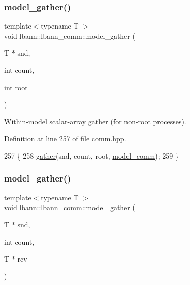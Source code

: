 \subsubsection{\texorpdfstring{model\+\_\+gather()}{model\_gather()}\hspace{0.1cm}{\footnotesize\ttfamily [3/4]}}
{\footnotesize\ttfamily template$<$typename T $>$ \\
void lbann\+::lbann\+\_\+comm\+::model\+\_\+gather (\begin{DoxyParamCaption}\item[{T $\ast$}]{snd,  }\item[{int}]{count,  }\item[{int}]{root }\end{DoxyParamCaption})\hspace{0.3cm}{\ttfamily [inline]}}

Within-\/model scalar-\/array gather (for non-\/root processes). 

Definition at line 257 of file comm.\+hpp.


\begin{DoxyCode}
257                                                  \{
258     \hyperlink{classlbann_1_1lbann__comm_aa784298e6ed0f9f01a20b179d5110df9}{gather}(snd, count, root, \hyperlink{classlbann_1_1lbann__comm_a58a75b76bd61ec8a26c1cbbec3dc2f45}{model\_comm});
259   \}
\end{DoxyCode}
\mbox{\label{classlbann_1_1lbann__comm_adc1c96023f4546d57f0a85e905d070b4}} 
\subsubsection{\texorpdfstring{model\+\_\+gather()}{model\_gather()}\hspace{0.1cm}{\footnotesize\ttfamily [4/4]}}
{\footnotesize\ttfamily template$<$typename T $>$ \\
void lbann\+::lbann\+\_\+comm\+::model\+\_\+gather (\begin{DoxyParamCaption}\item[{T $\ast$}]{snd,  }\item[{int}]{count,  }\item[{T $\ast$}]{rcv }\end{DoxyParamCaption})\hspace{0.3cm}{\ttfamily [inline]}}

